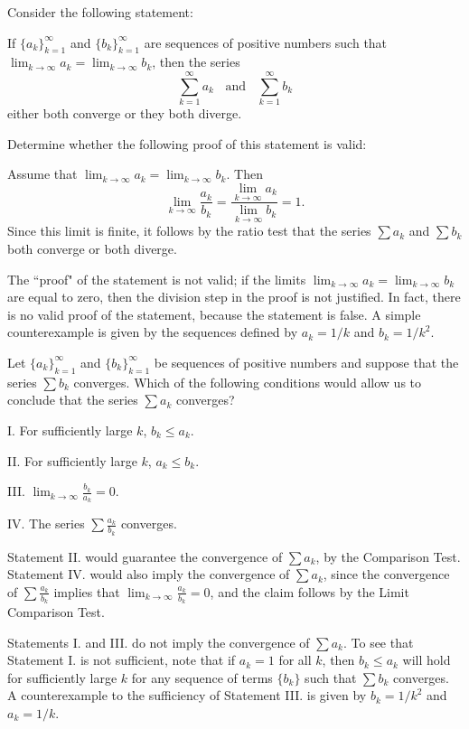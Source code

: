 \documentclass[]{ximera}
\begin{document}
\begin{problem}
Consider the following statement: 

If $\{a_k\}_{k=1}^\infty$ and $\{b_k\}_{k=1}^\infty$ are sequences of positive numbers such that $\lim_{k\rightarrow \infty} a_k = \lim_{k \rightarrow \infty} b_k$, then the series 
$$
\sum_{k=1}^\infty a_k \;\; \mbox{ and } \;\; \sum_{k=1}^\infty b_k
$$
either both converge or they both diverge. 

Determine whether the following proof of this statement is valid:

Assume that $\lim_{k\rightarrow \infty} a_k = \lim_{k \rightarrow \infty} b_k$. Then
$$
\lim_{k \rightarrow \infty} \frac{a_k}{b_k} = \frac{\lim_{k\rightarrow \infty} a_k}{\lim_{k\rightarrow \infty} b_k} = 1.
$$
Since this limit is finite, it follows by the ratio test that the series $\sum a_k$ and $\sum b_k$ both converge or both diverge. 

\begin{solution}
The ``proof" of the statement is not valid; if the limits $\lim_{k\rightarrow \infty} a_k = \lim_{k \rightarrow \infty} b_k$ are equal to zero, then the division step in the proof is not justified. In fact, there is no valid proof of the statement, because the statement is false. A simple counterexample is given by the sequences defined by $a_k = 1/k$ and $b_k = 1/k^2$. 
\end{solution}
\end{problem}


\begin{problem}
Let $\{a_k\}_{k=1}^\infty$ and $\{b_k\}_{k=1}^\infty$ be sequences of positive numbers and suppose that the series $\sum b_k$ converges. Which of the following conditions would allow us to conclude that the series $\sum a_k$ converges?

I. For sufficiently large $k$, $b_k \leq a_k$. 

II. For sufficiently large $k$, $a_k \leq b_k$.

III. $\lim_{k\rightarrow \infty} \frac{b_k}{a_k} = 0$.

IV. The series $\sum \frac{a_k}{b_k}$ converges. 

\begin{solution}
Statement II. would guarantee the convergence of $\sum a_k$, by the Comparison Test. Statement IV. would also imply the convergence of $\sum a_k$, since the convergence of $\sum \frac{a_k}{b_k}$ implies that $\lim_{k\rightarrow \infty} \frac{a_k}{b_k} = 0$, and the claim follows by the Limit Comparison Test.


Statements I. and III. do not imply the convergence of $\sum a_k$. To see that Statement I. is not sufficient, note that if $a_k = 1$ for all $k$, then $b_k \leq a_k$ will hold for sufficiently large $k$ for any sequence of terms $\{b_k\}$ such that $\sum b_k$ converges. A counterexample to the sufficiency of Statement III. is given by $b_k = 1/k^2$ and $a_k = 1/k$.
\end{solution}
\end{problem}
\end{document}
